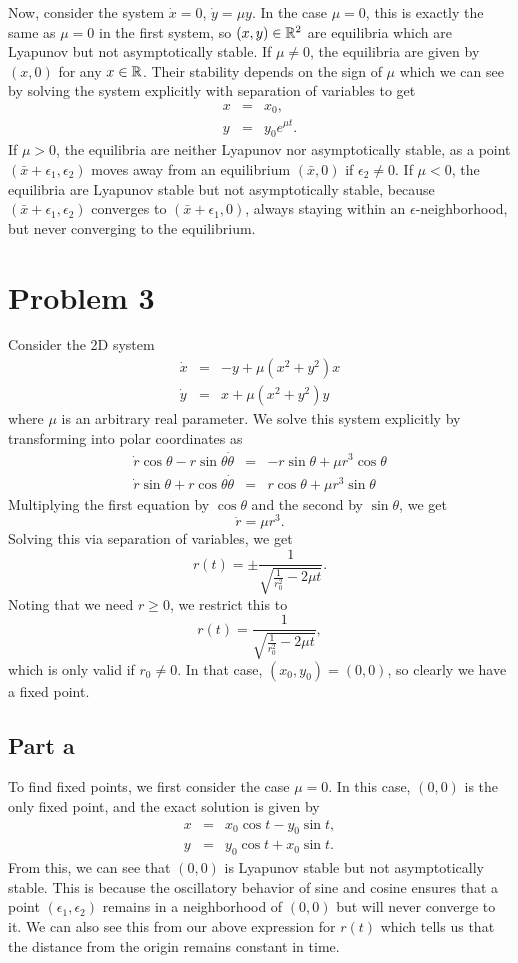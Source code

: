 \documentclass{article}
\begin{document}
Now, consider the system $\dot x = 0$, $\dot y = \mu y$. In the case $\mu=0$, this is exactly the same as $\mu=0$ in the first system, so $(x,y)\in\mathbb{R}^2$ are equilibria which are Lyapunov but not asymptotically stable. If $\mu\neq0$, the equilibria are given by $(x,0)$ for any $x\in\mathbb{R}$. Their stability depends on the sign of $\mu$ which we can see by solving the system explicitly with separation of variables to get
\begin{eqnarray*} 
	x &=& x_0, \\
	y &=& y_0e^{\mu t}. 
\end{eqnarray*}
If $\mu>0$, the equilibria are neither Lyapunov nor asymptotically stable, as a point $(\bar x+\epsilon_1,\epsilon_2)$ moves away from an equilibrium $(\bar x,0)$ if $\epsilon_2\neq0$. If $\mu<0$, the equilibria are Lyapunov stable but not asymptotically stable, because $(\bar x+\epsilon_1,\epsilon_2)$ converges to $(\bar x+\epsilon_1,0)$, always staying within an $\epsilon$-neighborhood, but never converging to the equilibrium.

\section{Problem 3}
Consider the 2D system
\begin{eqnarray*} 
	\dot x &=& -y + \mu (x^2 + y^2)x  \\
	\dot y &=& x + \mu (x^2 + y^2) y
\end{eqnarray*}
where $\mu$ is an arbitrary real parameter. We solve this system explicitly by transforming into polar coordinates as 
\begin{eqnarray*} 
	\dot r\cos\theta-r\sin\theta\dot\theta &=& -r\sin\theta + \mu r^3\cos\theta  \\
	\dot r\sin\theta+r\cos\theta\dot\theta &=& r\cos\theta + \mu r^3\sin\theta
\end{eqnarray*}
Multiplying the first equation by $\cos\theta$ and the second by $\sin\theta$, we get
\[
\dot r=\mu r^3.
\]
Solving this via separation of variables, we get 
\[
r(t) = \pm\frac{1}{\sqrt{\frac{1}{r_0^2}-2\mu t}}.
\]
Noting that we need $r\geq0$, we restrict this to
\[
r(t) = \frac{1}{\sqrt{\frac{1}{r_0^2}-2\mu t}},
\]
which is only valid if $r_0\neq0$. In that case, $(x_0,y_0)=(0,0)$, so clearly we have a fixed point. 

\subsection{Part a}
To find fixed points, we first consider the case $\mu=0$. In this case, $(0,0)$ is the only fixed point, and the exact solution is given by
\begin{eqnarray*} 
	x &=& x_0\cos t-y_0\sin t, \\
	y &=& y_0\cos t+x_0\sin t. 
\end{eqnarray*}
From this, we can see that $(0,0)$ is Lyapunov stable but not asymptotically stable. This is because the oscillatory behavior of sine and cosine ensures that a point $(\epsilon_1,\epsilon_2)$ remains in a neighborhood of $(0,0)$ but will never converge to it. We can also see this from our above expression for $r(t)$ which tells us that the distance from the origin remains constant in time. 
\end{document}
